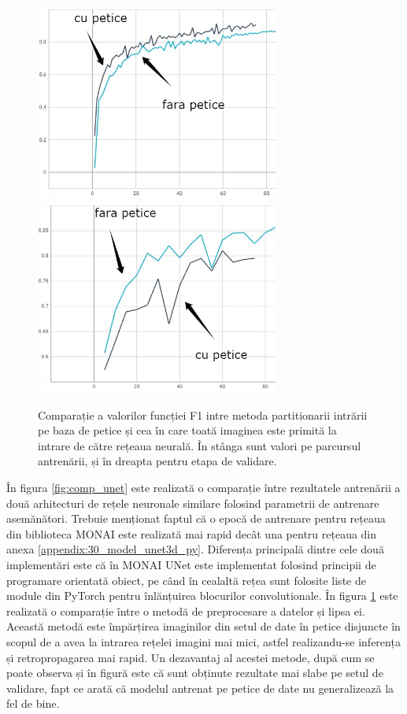 \begin{figure}[!htb]
    \centering
    \includegraphics[width=8cm]{images/seg_train_results/patches_train_comp.png}
    \includegraphics[width=8cm]{images/seg_train_results/patches_valid_comp.png}
    \\
    \caption{Comparație a valorilor funcției F1 intre metoda partitionarii intrării pe baza de petice și cea în care toată imaginea este primită la intrare de către rețeaua neurală. În stânga sunt valori pe parcursul antrenării, și în dreapta pentru etapa de validare.}
    \label{fig:comp_patches}
\end{figure}

În figura \ref{fig:comp_unet} este realizată o comparație între rezultatele antrenării a două arhitecturi de rețele neuronale similare folosind parametrii de antrenare asemănători. Trebuie menționat faptul că o epocă de antrenare pentru rețeaua din biblioteca MONAI este realizată mai rapid decât una pentru rețeaua din anexa \ref{appendix:30_model_unet3d_py}. Diferența principală dintre cele două implementări este că în MONAI UNet este implementat folosind principii de programare orientată obiect, pe când în cealaltă rețea sunt folosite liste de module din PyTorch pentru înlănțuirea blocurilor convolutionale. În figura \ref{fig:comp_patches} este realizată o comparație între o metodă de preprocesare a datelor și lipsa ei. Această metodă este împărțirea imaginilor din setul de date în petice disjuncte în scopul de a avea la intrarea rețelei imagini mai mici, astfel realizandu-se inferența și retropropagarea mai rapid. Un dezavantaj al acestei metode, după cum se poate observa și în figură este că sunt obținute rezultate mai slabe pe setul de validare, fapt ce arată că modelul antrenat pe petice de date nu generalizează la fel de bine.


